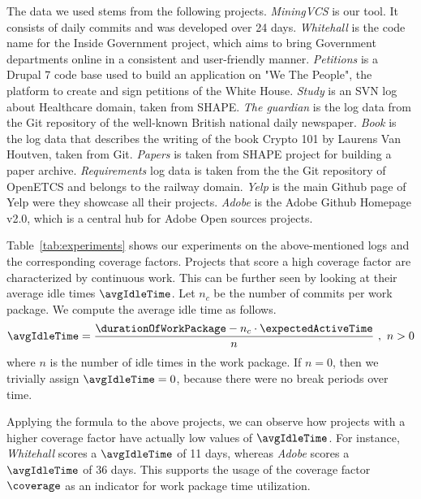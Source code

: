 The data we used stems from the following projects. \emph{MiningVCS} is our tool. It consists of daily commits and was developed over 24 days.
\emph{Whitehall} is the code name for the Inside Government project, which aims to bring Government departments online in a consistent and user-friendly manner. \emph{Petitions} is a Drupal 7 code base used to build an application on "We The People", the platform to create and sign petitions of the White House.
\emph{Study} is an SVN log about Healthcare domain, taken from SHAPE.
\emph{The guardian} is the log data from the Git repository of the well-known British national daily newspaper.
\emph{Book} is the log data that describes the writing of the book Crypto 101 by Laurens Van Houtven, taken from Git.
\emph{Papers} is taken from SHAPE project for building a paper archive. %
\emph{Requirements} log data is taken from the the Git repository of OpenETCS and belongs to the railway domain.
\emph{Yelp} is the main Github page of Yelp were they showcase all their projects.
\emph{Adobe} is the Adobe Github Homepage v2.0, which is a central hub for Adobe Open sources projects.

Table~\ref{tab:experiments} shows our experiments on the above-mentioned logs and the corresponding coverage factors. Projects that score a high coverage factor are characterized by continuous work. This can be further seen by looking at their average idle times $\avgIdleTime$. Let $n_c$ be the number of commits per work package. We compute the average idle time as follows.
\begin{equation}
\avgIdleTime = \frac{\durationOfWorkPackage  - n_c \cdot \expectedActiveTime }{n}
~,~ n>0
\end{equation}
where $n $ is the number of idle times in the work package. If $n=0$, then we trivially assign $\avgIdleTime = 0$, because there were no break periods over time.

Applying the formula to the above projects, we can observe how projects with a higher coverage factor have actually low values of $\avgIdleTime$. For instance, \emph{Whitehall} scores a $\avgIdleTime$ of 11 days, whereas \emph{Adobe} scores a $\avgIdleTime$ of 36 days.
This supports the usage of the coverage factor $\coverage$ as an indicator for work package time utilization. 